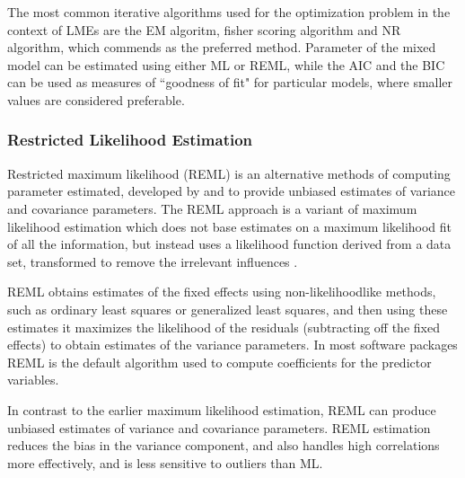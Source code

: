 \documentclass[12pt, a4paper]{report}
\theoremstyle{plain}
\theoremstyle{definition}
\theoremstyle{remark}
\begin{document}
	The most common iterative algorithms used for the optimization
	problem in the context of LMEs are the EM algoritm, fisher scoring	algorithm and NR algorithm, which \citet{west} commends as the preferred method. Parameter of the mixed model can be estimated using either ML or REML, while the AIC and the BIC can be used as measures of
	``goodness of fit" for particular models, where smaller values are
	considered preferable.
	
	
%	

	
\subsubsection{Restricted Likelihood Estimation}

Restricted maximum likelihood (REML) is an alternative methods of
		computing parameter estimated, developed by \citet*{PT71} and
		\citet{Harville} to provide unbiased estimates of variance and
		covariance parameters. The REML approach is a variant of maximum likelihood estimation which does not base estimates on a maximum likelihood fit of all the information, but instead uses a likelihood function derived from a data set, transformed to remove the irrelevant influences \citep{REMLDefine}.
%		

		 REML obtains estimates of the fixed effects using non-likelihoodlike methods, such as ordinary least squares or generalized least squares, and then using these estimates it
	maximizes the likelihood of the residuals (subtracting off the
	fixed effects) to obtain estimates of the variance parameters. In
	most software packages REML is the default algorithm used to
	compute coefficients for the predictor variables. 
	
	
			In contrast to the earlier maximum likelihood estimation, REML can produce unbiased estimates of variance and covariance parameters. REML estimation
			reduces the bias in the variance component, and also handles high
			correlations more effectively, and is less sensitive to outliers
			than ML.
			
\end{document}
